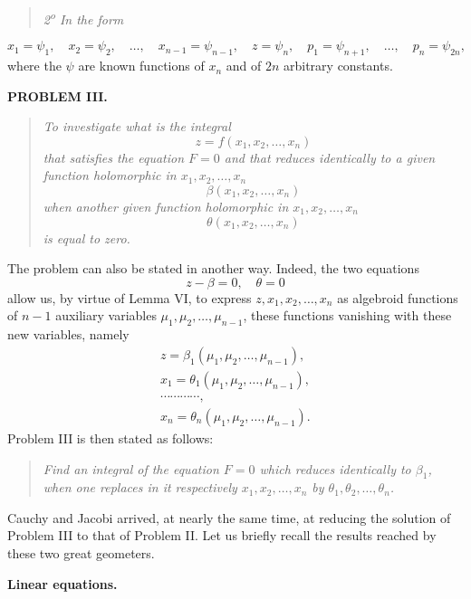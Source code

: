 \documentclass[11pt]{article}
\begin{document}
\begin{quote}\itshape
2\textsuperscript{o} In the form
\end{quote}
\begin{equation*}\tag{6}
x_1=\psi_1,
\quad x_2=\psi_2,
\quad \ldots,
\quad x_{n-1}=\psi_{n-1},
\quad z=\psi_n,
\quad p_1=\psi_{n+1},
\quad \ldots,
\quad p_n=\psi_{2n},
\end{equation*}
where the $\psi$ are known functions of $x_n$ and of $2n$ arbitrary constants.

\begin{center}
\textbf{PROBLEM III.}
\end{center}

\begin{quote}\itshape
To investigate what is the integral
\[
z=f(x_1,x_2,\ldots,x_n)
\]
that satisfies the equation $F=0$ and that reduces identically to a given function holomorphic in $x_1,x_2,\ldots,x_n$
\[
\beta(x_1,x_2,\ldots,x_n)
\]
when another given function holomorphic in $x_1,x_2,\ldots,x_n$
\[
\theta(x_1,x_2,\ldots,x_n)
\]
is equal to zero.
\end{quote}

The problem can also be stated in another way. Indeed, the two equations
\[
z-\beta=0,
\quad \theta=0
\]
allow us, by virtue of Lemma VI, to express $z,x_1,x_2,\ldots,x_n$ as algebroid functions of $n-1$ auxiliary variables $\mu_1,\mu_2,\ldots,\mu_{n-1}$, these functions vanishing with these new variables, namely
\[
\begin{gathered}
z=\beta_1(\mu_1,\mu_2,\ldots,\mu_{n-1}),\\
x_1=\theta_1(\mu_1,\mu_2,\ldots,\mu_{n-1}),\\
\cdots\cdots\cdots\cdots,\\
x_n=\theta_n(\mu_1,\mu_2,\ldots,\mu_{n-1}).
\end{gathered}
\]
Problem III is then stated as follows:

\begin{quote}\itshape
Find an integral of the equation $F=0$ which reduces identically to $\beta_1$, when one replaces in it respectively $x_1,x_2,\ldots,x_n$ by $\theta_1,\theta_2,\ldots,\theta_n$.
\end{quote}

Cauchy and Jacobi arrived, at nearly the same time, at reducing the solution of Problem III to that of Problem II. Let us briefly recall the results reached by these two great geometers.

\begin{center}
\textbf{Linear equations.}
\end{center}
\end{document}
